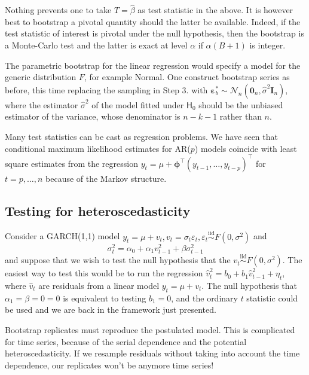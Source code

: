 \documentclass[]{book}
\begin{document}
Nothing prevents one to take \(T=\hat{\beta}\) as test statistic in the above. It is however best to bootstrap a pivotal quantity should the latter be available. Indeed, if the test statistic of interest is pivotal under the null hypothesis, then the bootstrap is a Monte-Carlo test and the latter is exact at level \(\alpha\) if \(\alpha(B+1)\) is integer.

The parametric bootstrap for the linear regression would specify a model for the generic distribution \(F\), for example Normal. One construct bootstrap series as before, this time replacing the sampling in Step 3. with \(\boldsymbol{\varepsilon}^*_b \sim \mathcal{N}_n(\boldsymbol{0}_n, \widehat{\sigma}^2\mathbf{I}_n)\), where the estimator \(\widehat{\sigma}^2\) of the model fitted under \(\mathsf{H}_0\) should be the unbiased estimator of the variance, whose denominator is \(n-k-1\) rather than \(n\).

Many test statistics can be cast as regression problems. We have seen that conditional maximum likelihood estimates for AR(\(p\)) models coincide with least square estimates from the regression \(y_t=\mu+\boldsymbol{\phi}^\top(y_{t-1}, \ldots, y_{t-p})^\top\) for \(t=p, \ldots, n\) because of the Markov structure.

\hypertarget{testing-for-heteroscedasticity}{%
\subsection{Testing for heteroscedasticity}\label{testing-for-heteroscedasticity}}

Consider a GARCH(1,1) model
\(y_t=\mu + v_t, v_t = \sigma_t\varepsilon_t, \varepsilon_t \stackrel{\mathrm{iid}}{\sim}F(0,\sigma^2)\) and
\[\sigma^2_t = \alpha_0 + \alpha_1 v_{t-1}^2 + \beta \sigma^2_{t-1}\]
and suppose that we wish to test the null hypothesis that the \(v_t \stackrel{\mathrm{iid}}{\sim}F(0,\sigma^2)\). The easiest way to test this would be
to run the regression \(\widehat{v}_t^2 = b_0 + b_1 \widehat{v}_{t-1}^2 + \eta_t\), where \(\widehat{v}_t\) are residuals from a linear model \(y_t=\mu +v_t\). The null hypothesis that \(\alpha_1=\beta=0=0\) is equivalent to testing \(b_1=0\), and the ordinary \(t\) statistic could be used and we are back in the framework just presented.

Bootstrap replicates must reproduce the postulated model. This is complicated for time series, because of the serial dependence and the potential heteroscedasticity. If we resample residuals without taking into account the time dependence, our replicates won't be anymore time series!
\end{document}
